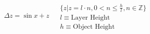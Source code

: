 \documentclass[border={1pt 1pt 1pt 1pt}]{standalone}
\begin{document}
$
	\begin{array}{c|c}
		\begin{matrix}
			\Delta{z}=\sin{x} + z\\
		\end{matrix}
		&
		\begin{matrix}
			\{z|z=l\cdot n, 0 < n \leq \frac{h}{l}, n\in \mathbb{Z}\}\\
			l \equiv \text{Layer Height}\\
			h \equiv \text{Object Height}
		\end{matrix}
	\end{array}
$
\end{document}

